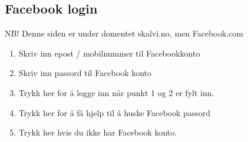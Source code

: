 \subsection{Facebook login}
\begin{center}
\end{center}
NB! Denne siden er under domentet skalvi.no, men Facebook.com
\begin{enumerate}[nosep]
    \item Skriv inn epost / mobilnummer til Facebookkonto
    \item Skriv inn passord til Facebook konto
    \item Trykk her for å logge inn når punkt 1 og 2 er fylt inn.
    \item Trykk her for å få hjelp til å huske Facebook passord
    \item Trykk her hvis du ikke har Facebook konto.
\end{enumerate}

